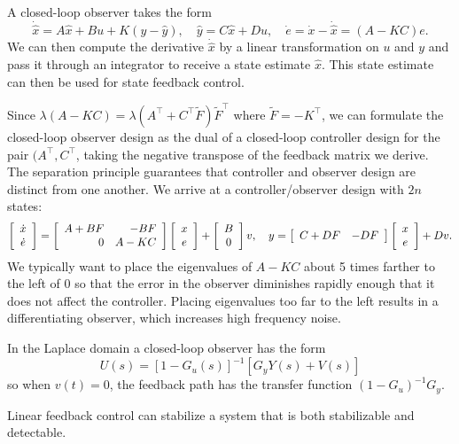 \documentclass{report}
\begin{document}
A closed-loop observer takes the form
$$
\dot{\hat{x}} = A\hat{x} + B u + K(y - \hat{y}), \quad
\hat{y} = C \hat{x} + D u, \quad
\dot{e} = \dot{x} - \dot{\hat{x}} = (A - KC)e.
$$
We can then compute the derivative $\dot{\hat{x}}$ by a linear
transformation on $u$ and $y$ and pass it through an integrator to
receive a state estimate $\hat{x}$. This state estimate can then be
used for state feedback control.

Since $\lambda(A - KC) = \lambda(A^\top + C^\top \tilde{F})
\tilde{F}^\top$ where $\tilde{F} = -K^\top$, we can formulate the
closed-loop observer design as the dual of a closed-loop controller
design for the pair $(A^\top, C^\top$, taking the negative transpose
of the feedback matrix we derive. The separation principle guarantees
that controller and observer design are distinct from one another. We
arrive at a controller/observer design with $2n$ states:
$$
\left[\begin{array}{c}
  \dot{x} \\
  \dot{e}
\end{array}\right] =
\left[\begin{array}{r r}
  A + B F &    -B F \\
        0 & A - K C
\end{array}\right]
\left[\begin{array}{c}
  x \\
  e
\end{array}\right]
+
\left[\begin{array}{c}
  B \\
  0
\end{array}\right]v, \quad
y =
\left[\begin{array}{r r}
  C + DF & -DF
\end{array}\right]
\left[\begin{array}{c}
  x \\
  e
\end{array}\right]
+ D v.
$$
We typically want to place the eigenvalues of $A - KC$ about 5 times
farther to the left of 0 so that the error in the observer diminishes
rapidly enough that it does not affect the controller. Placing
eigenvalues too far to the left results in a differentiating observer,
which increases high frequency noise.

In the Laplace domain a closed-loop observer has the form
$$
U(s) = [1 - G_u(s)]^{-1} [G_y Y(s) + V(s)]
$$
so when $v(t) = 0$, the feedback path has the transfer function
$(1 - G_u)^{-1}G_y$.

Linear feedback control can stabilize a system that is both
stabilizable and detectable.
\end{document}
